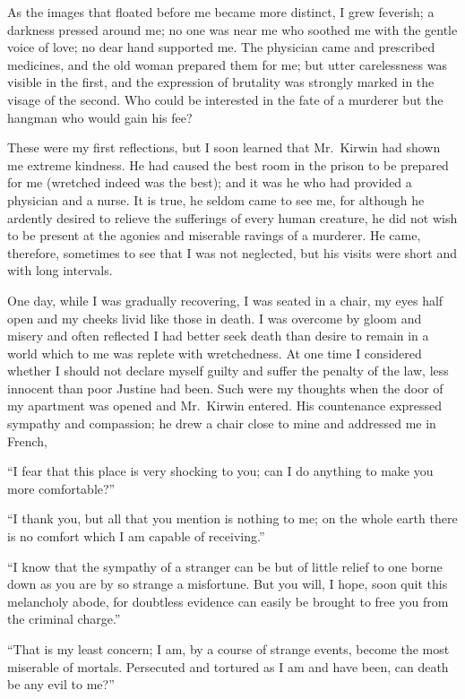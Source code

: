 \documentclass[12pt,openright]{book}
\begin{document}
As the images that floated before me became more distinct, I grew feverish; a darkness pressed around me; no one was near me who soothed me with the gentle voice of love; no dear hand supported me. The physician came and prescribed medicines, and the old woman prepared them for me; but utter carelessness was visible in the first, and the expression of brutality was strongly marked in the visage of the second. Who could be interested in the fate of a murderer but the hangman who would gain his fee?

These were my first reflections, but I soon learned that Mr. Kirwin had shown me extreme kindness. He had caused the best room in the prison to be prepared for me (wretched indeed was the best); and it was he who had provided a physician and a nurse. It is true, he seldom came to see me, for although he ardently desired to relieve the sufferings of every human creature, he did not wish to be present at the agonies and miserable ravings of a murderer. He came, therefore, sometimes to see that I was not neglected, but his visits were short and with long intervals.

One day, while I was gradually recovering, I was seated in a chair, my eyes half open and my cheeks livid like those in death. I was overcome by gloom and misery and often reflected I had better seek death than desire to remain in a world which to me was replete with wretchedness. At one time I considered whether I should not declare myself guilty and suffer the penalty of the law, less innocent than poor Justine had been. Such were my thoughts when the door of my apartment was opened and Mr. Kirwin entered. His countenance expressed sympathy and compassion; he drew a chair close to mine and addressed me in French,

“I fear that this place is very shocking to you; can I do anything to make you more comfortable?”

“I thank you, but all that you mention is nothing to me; on the whole earth there is no comfort which I am capable of receiving.”

“I know that the sympathy of a stranger can be but of little relief to one borne down as you are by so strange a misfortune. But you will, I hope, soon quit this melancholy abode, for doubtless evidence can easily be brought to free you from the criminal charge.”

“That is my least concern; I am, by a course of strange events, become the most miserable of mortals. Persecuted and tortured as I am and have been, can death be any evil to me?”
\end{document}
